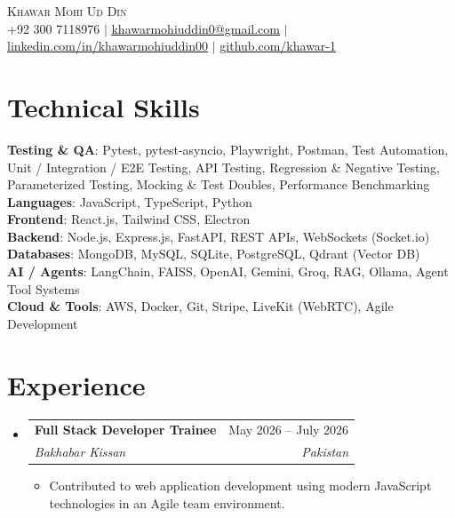 \documentclass[letterpaper,11pt]{article}
\makeatletter
\newcommand{\resumeItem}[1]{
  \item\small{
    {#1 \vspace{-2pt}}
  }
}
\newcommand{\resumeSubheading}[4]{
  \vspace{-2pt}\item
    \begin{tabular*}{0.97\textwidth}[t]{l@{\extracolsep{\fill}}r}
      \textbf{#1} & #2 \\
      \textit{\small#3} & \textit{\small #4} \\
    \end{tabular*}\vspace{-7pt}
}
\newcommand{\resumeSubHeadingListStart}{\begin{itemize}[leftmargin=0.15in, label={}]}
\newcommand{\resumeSubHeadingListEnd}{\end{itemize}}
\newcommand{\resumeItemListStart}{\begin{itemize}}
\newcommand{\resumeItemListEnd}{\end{itemize}\vspace{-5pt}}
\makeatother
\begin{document}
\begin{center}
    {\Huge \scshape Khawar Mohi Ud Din} \\ \vspace{4pt}
    \small +92 300 7118976 $|$
    \href{mailto:khawarmohiuddin0@gmail.com}{\underline{khawarmohiuddin0@gmail.com}} $|$
    \href{https://linkedin.com/in/khawarmohiuddin00}{\underline{linkedin.com/in/khawarmohiuddin00}} $|$
    \href{https://github.com/khawar-1}{\underline{github.com/khawar-1}}
\end{center}

\section{Technical Skills}
 \begin{itemize}[leftmargin=0.15in, label={}]
    \small{\item{
     \textbf{Testing \& QA}{: Pytest, pytest-asyncio, Playwright, Postman, Test Automation, Unit / Integration / E2E Testing, API Testing, Regression \& Negative Testing, Parameterized Testing, Mocking \& Test Doubles, Performance Benchmarking} \\
     \textbf{Languages}{: JavaScript, TypeScript, Python} \\
     \textbf{Frontend}{: React.js, Tailwind CSS, Electron} \\
     \textbf{Backend}{: Node.js, Express.js, FastAPI, REST APIs, WebSockets (Socket.io)} \\
     \textbf{Databases}{: MongoDB, MySQL, SQLite, PostgreSQL, Qdrant (Vector DB)} \\
     \textbf{AI / Agents}{: LangChain, FAISS, OpenAI, Gemini, Groq, RAG, Ollama, Agent Tool Systems} \\
     \textbf{Cloud \& Tools}{: AWS, Docker, Git, Stripe, LiveKit (WebRTC), Agile Development}
    }}
 \end{itemize}

\section{Experience}
  \resumeSubHeadingListStart
    \resumeSubheading
      {Full Stack Developer Trainee}{May 2026 -- July 2026}
      {Bakhabar Kissan}{Pakistan}
      \resumeItemListStart
        \resumeItem{Contributed to web application development using modern JavaScript technologies in an Agile team environment.}
      \resumeItemListEnd
  \resumeSubHeadingListEnd
\end{document}
